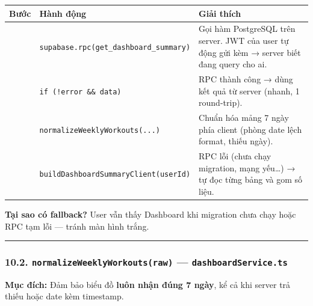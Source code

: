 \documentclass[12pt,a4paper]{article}
\begin{document}
{\def\LTcaptype{none} %
\begin{longtable}[]{@{}
  >{\raggedright\arraybackslash}p{}
  >{\raggedright\arraybackslash}p{}
  >{\raggedright\arraybackslash}p{}@{}}
\toprule\noalign{}
\begin{minipage}[b]{\linewidth}\raggedright
Bước
\end{minipage} & \begin{minipage}[b]{\linewidth}\raggedright
Hành động
\end{minipage} & \begin{minipage}[b]{\linewidth}\raggedright
Giải thích
\end{minipage} \\
\midrule\noalign{}
\endhead
\bottomrule\noalign{}
\endlastfoot
1 &
\texttt{supabase.rpc(\textquotesingle{}get\_dashboard\_summary\textquotesingle{})}
& Gọi hàm PostgreSQL trên server. JWT của user tự động gửi kèm → server
biết đang query cho ai. \\
2 & \texttt{if\ (!error\ \&\&\ data)} & RPC thành công → dùng kết quả từ
server (nhanh, 1 round-trip). \\
3 & \texttt{normalizeWeeklyWorkouts(...)} & Chuẩn hóa mảng 7 ngày phía
client (phòng date lệch format, thiếu ngày). \\
4 & \texttt{buildDashboardSummaryClient(userId)} & RPC lỗi (chưa chạy
migration, mạng yếu\ldots) → tự đọc từng bảng và gom số liệu. \\
\end{longtable}
}

\textbf{Tại sao có fallback?} User vẫn thấy Dashboard khi migration chưa
chạy hoặc RPC tạm lỗi --- tránh màn hình trắng.

\begin{center}\rule{0.5\linewidth}{0.5pt}\end{center}

\subsubsection{\texorpdfstring{10.2.
\texttt{normalizeWeeklyWorkouts(raw)} ---
\texttt{dashboardService.ts}}{10.2. normalizeWeeklyWorkouts(raw) --- dashboardService.ts}}\label{normalizeweeklyworkoutsraw-dashboardservice.ts}

\textbf{Mục đích:} Đảm bảo biểu đồ \textbf{luôn nhận đúng 7 ngày}, kể cả
khi server trả thiếu hoặc date kèm timestamp.
\end{document}

